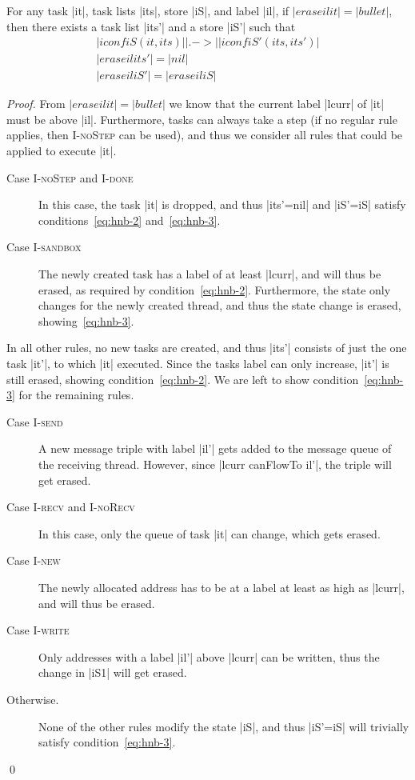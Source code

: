 \begin{lemma}
  \label{lemma:high-not-blocking}
  For any task |it|, task lists |its|, store |iS|, and label |il|, if
  $|erase il it|=|bullet|$, then there exists a task list
  |its'| and a store |iS'| such that
  \begin{align}
  |iconf iS (it, its)| |.->| |iconf iS' (its, its')| \label{eq:hnb-1} \\
  |erase il its'|=|nil| \label{eq:hnb-2}\\
  |erase il iS'|=|erase il iS| \label{eq:hnb-3}
  \end{align}
\end{lemma}
\begin{proof}
  From $|erase il it|=|bullet|$ we know that the current label |lcurr| of |it|
  must be above |il|.  Furthermore, tasks can always take a step (if no
  regular rule applies, then \textsc{I-noStep} can be used), and thus
  we consider all rules that could be applied to execute |it|.
  \begin{description}
    \item[Case \textsc{I-noStep} and \textsc{I-done}]
    In this case, the task |it| is dropped,
    and thus |its'=nil| and |iS'=iS| satisfy
    conditions~\eqref{eq:hnb-2} and~\eqref{eq:hnb-3}.
    \item[Case \textsc{I-sandbox}]
    The newly created task has a label of at least |lcurr|, and will thus be
    erased, as required by condition~\eqref{eq:hnb-2}.  Furthermore, the
    state only changes for the newly created thread, and thus the state
    change is erased, showing~\eqref{eq:hnb-3}.
  \end{description}
  In all other rules, no new tasks are created, and thus |its'| consists of just
  the one task |it'|, to which |it| executed.  Since the tasks label can
  only increase, |it'| is still erased, showing condition~\eqref{eq:hnb-2}.
  We are left to show condition~\eqref{eq:hnb-3} for the remaining rules.
  \begin{description}
    \item[Case \textsc{I-send}]
    A new message triple with label |il'| gets added to the message
    queue of the receiving thread.  However, since |lcurr canFlowTo il'|,
    the triple will get erased.
    \item[Case \textsc{I-recv} and \textsc{I-noRecv}]
    In this case, only the queue of
    task |it| can change, which gets erased.
    \item[Case \textsc{I-new}] The newly allocated address has to be at a
    label at least as high as |lcurr|, and will thus be erased.
    \item[Case \textsc{I-write}] Only addresses with a label |il'| above
    |lcurr| can be written, thus the change in |iS1| will get erased.
    \item[Otherwise.]  None of the other rules modify the state |iS|, and
    thus |iS'=iS| will trivially satisfy condition~\eqref{eq:hnb-3}.
  \end{description}
  \qed
\end{proof}

